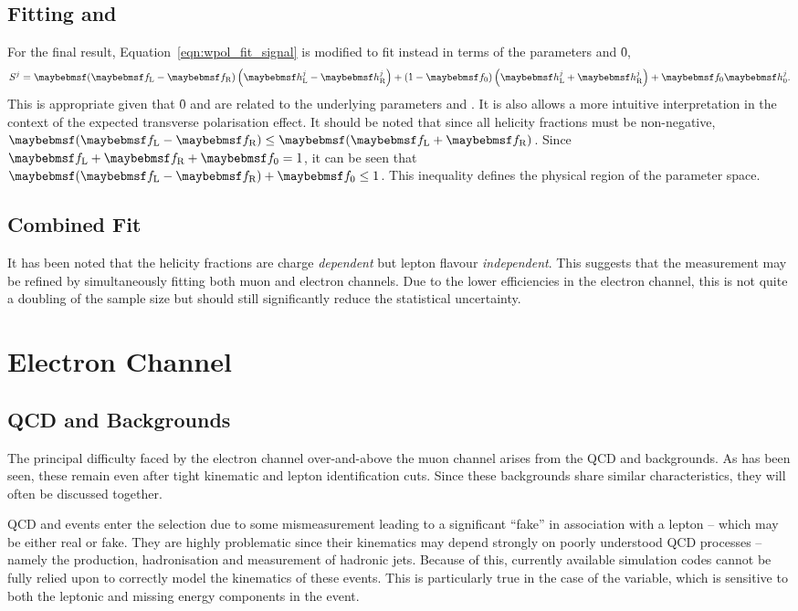 \subsection[Fitting \fLmfR and \f0]{Fitting \boldmath{\fLmfR} and }
\label{sec:wpol_fit_fmfr}
For the final result, Equation~\ref{eqn:wpol_fit_signal} is modified to fit
instead in terms of the parameters \fLmfR and \f0,
\begin{equation*}
S^j = \fLmfR \left (\hLj -\hRj\right) + \left(1-\f0\right)\left(\hLj +\hRj\right) +\f0\hZj.
\end{equation*}
This is appropriate given that \f0 and \fLmfR are related to the underlying
parameters \Azero and \Afour. It is also allows a more intuitive interpretation
in the context of the expected transverse polarisation effect. It should be
noted that since all helicity fractions must be non-negative,
$\fLmfR\leq\fLpfR$. Since $\fL +\fR + \f0 = 1$, it can be seen that $\fLmfR +
\f0 \leq 1$. This inequality defines the physical region of the parameter space.

\subsection{Combined Fit}
It has been noted that the helicity fractions are charge \emph{dependent} but
lepton flavour \emph{independent}. This suggests that the measurement may be
refined by simultaneously fitting both muon and electron channels. Due to the
lower efficiencies in the electron channel, this is not quite a doubling of the
sample size but should still significantly reduce the statistical uncertainty.

\section{Electron Channel}
\subsection[\ac{QCD} and \texorpdfstring{\gammajets}{Photon+Jets} Backgounds]{\ac{QCD} and \boldmath{\gammajets} Backgrounds}
The principal difficulty faced by the electron channel over-and-above the muon
channel arises from the \ac{QCD} and \gammajets backgrounds. As has been seen,
these remain even after tight kinematic and lepton identification cuts. Since
these backgrounds share similar characteristics, they will often be discussed
together.

\ac{QCD} and \gammajets events enter the selection due to some mismeasurement
leading to a significant ``fake'' \PtW in association with a lepton -- which may
be either real or fake. They are highly problematic since their kinematics may
depend strongly on poorly understood \ac{QCD} processes -- namely the
production, hadronisation and measurement of hadronic jets. Because of this,
currently available simulation codes cannot be fully relied upon to correctly
model the kinematics of these events. This is particularly true in the case of
the \LP variable, which is sensitive to both the leptonic and missing energy
components in the event.

